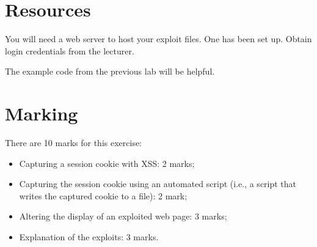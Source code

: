 \documentclass{article}
\begin{document}
\section{Resources}
You will need a web server to host your exploit files.  One has been set up.  Obtain
login credentials from the lecturer.

The example code from the previous lab will be helpful.

\section{Marking}

There are 10 marks for this exercise:

\begin{itemize}
	\item Capturing a session cookie with XSS: 2 marks;
	\item Capturing the session cookie using an automated script
		(i.e., a script that writes the captured cookie to 
		a file): 2 mark;
	\item Altering the display of an exploited web page: 3 marks;
	\item Explanation of the exploits: 3 marks.
\end{itemize}
\end{document}

